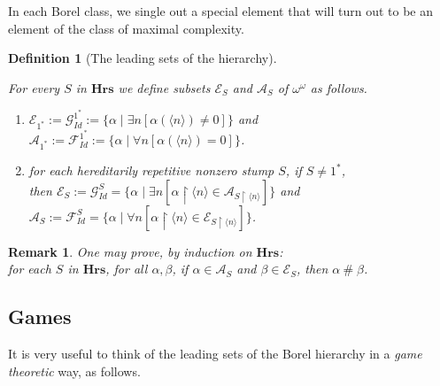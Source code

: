 \documentclass[a4paper]{amsart}
\theoremstyle{plain}
\newtheorem{remark}{Remark}
\newtheorem{definition}{Definition}
\begin{document}
 In each Borel class, we single out a special element that will turn out to be an element of the class of maximal complexity.
\begin{definition}[The leading sets of the hierarchy]\label{D:E_SA_S}

 For every $S$ in $\mathbf{Hrs}$ we define subsets $\mathcal{E}_S$ and $\mathcal{A}_S$ of $\omega^\omega$ as follows.

\begin{enumerate}[\upshape (i)] \item $\mathcal{E}_{1^\ast}:=\mathcal{G}^{1^\ast}_{Id}:=\{\alpha\mid\exists n[\alpha(\langle n \rangle)\neq 0]\}$ and $\mathcal{A}_{1^\ast}:=\mathcal{F}^{1^\ast}_{Id}:=\{\alpha\mid\forall  n[\alpha(\langle n \rangle)= 0]\}$. \item for each hereditarily repetitive nonzero stump $S$, if $S\neq 1^\ast$, \\then $\mathcal{E}_S:= \mathcal{G}^S_{Id}=\{\alpha\mid \exists n [\alpha\upharpoonright\langle n \rangle \in \mathcal{A}_{S\upharpoonright \langle n \rangle}]\}$ and \\
 $\mathcal{A}_S:=\mathcal{F}^S_{Id}= \{\alpha\mid \forall n[\alpha\upharpoonright\langle n \rangle \in \mathcal{E}_{S\upharpoonright \langle n \rangle}]\}$. \end{enumerate}  
 
 
 \end{definition}
 
 \begin{remark} One may prove, by induction on $\mathbf{Hrs}$: \\for each $S$ in $\mathbf{Hrs}$, for all $\alpha, \beta$, if $\alpha \in \mathcal{A}_S$ and $\beta\in \mathcal{E}_S$, then $\alpha\:\#\;\beta$. \end{remark}
\subsection{Games} It is very useful to think of the leading sets of the Borel hierarchy in a {\it game theoretic} way, as follows. 
 
\end{document}
